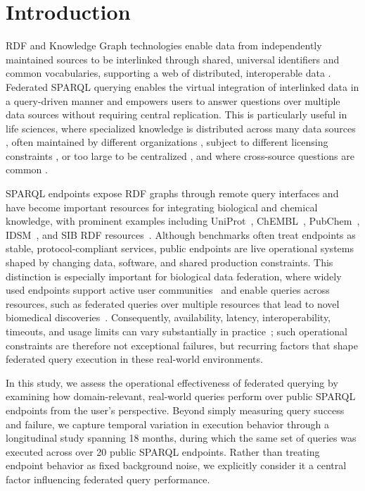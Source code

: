 \documentclass[runningheads]{llncs}
\begin{document}
\section{Introduction}\label{sec1}
RDF and Knowledge Graph technologies enable data from independently maintained sources to be interlinked through shared, universal identifiers and common vocabularies, supporting a web of distributed, interoperable data \cite{hogan2021knowledge}.
Federated SPARQL querying enables the virtual integration of interlinked data in a query-driven manner and empowers users to answer questions over multiple data sources without requiring central replication. 
This is particularly useful in life sciences, where specialized knowledge is distributed across many data sources \cite{hasnain2017biofed}, often maintained by different organizations \cite{khan2017safe}, subject to different licensing constraints \cite{Moreau2021}, or too large to be centralized \cite{lubiana2025split}, and where cross-source questions are common \cite{Morgat2020Rhea}. 

SPARQL endpoints expose RDF graphs through remote query interfaces and have become important resources for integrating biological and chemical knowledge, with prominent examples including UniProt~\cite{uniprot2025}, ChEMBL~\cite{Willighagen2013ChEMBL}, PubChem~\cite{Fu2015PubChemRDF}, IDSM~\cite{Galgonek2021ChemWebRDF}, and SIB RDF resources~\cite{sib2024semanticweb}. 
Although benchmarks often treat endpoints as stable, protocol-compliant services, public endpoints are live operational systems shaped by changing data, software, and shared production constraints. 
This distinction is especially important for biological data federation, where widely used endpoints support active user communities~\cite{uniprot2025} and enable queries across resources, such as federated queries over multiple resources that lead to novel biomedical discoveries~\cite{Morgat2020Rhea}. 
Consequently, availability, latency, interoperability, timeouts, and usage limits can vary substantially in practice~\cite{Vandenbussche2017SPARQLES,kartographi2022}; such operational constraints are therefore not exceptional failures, but recurring factors that shape federated query execution in these real-world environments.

In this study, we assess the operational effectiveness of federated querying by examining how domain-relevant, real-world queries perform over public SPARQL endpoints from the user’s perspective. 
Beyond simply measuring query success and failure, we capture temporal variation in execution behavior through a longitudinal study spanning 18 months, during which the same set of queries was executed across over 20 public SPARQL endpoints. 
Rather than treating endpoint behavior as fixed background noise, we explicitly consider it a central factor influencing federated query performance.
\end{document}

